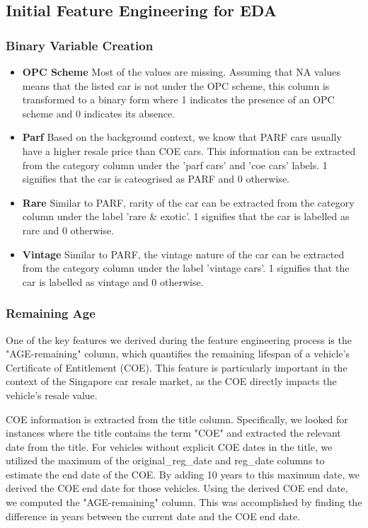 \documentclass[conference]{IEEEtran}
\begin{document}
\subsection{Initial Feature Engineering for EDA}
\label{subsec:feature_engineering}
\subsubsection{Binary Variable Creation}
\begin{itemize}
    \item \textbf{OPC Scheme} Most of the values are missing. Assuming that NA values means that the listed car is not under the OPC scheme, this column is transformed to a binary form where 1 indicates the presence of an OPC scheme and 0 indicates its absence.
    
    \item \textbf{Parf} Based on the background context, we know that PARF cars usually have a higher resale price than COE cars. This information can be extracted from the category column under the 'parf cars' and 'coe cars' labels. 1 signifies that the car is cateogrised as PARF and 0 otherwise.
    
    \item \textbf{Rare} Similar to PARF, rarity of the car can be extracted from the category column under the label 'rare \& exotic'. 1 signifies that the car is labelled as rare and 0 otherwise.
    
    \item \textbf{Vintage} Similar to PARF, the vintage nature of the car can be extracted from the category column under the label 'vintage cars'. 1 signifies that the car is labelled as vintage and 0 otherwise.
    
\end{itemize}

\subsubsection{Remaining Age}
One of the key features we derived during the feature engineering process is the "AGE-remaining" column, which quantifies the remaining lifespan of a vehicle's Certificate of Entitlement (COE). This feature is particularly important in the context of the Singapore car resale market, as the COE directly impacts the vehicle's resale value.

COE information is extracted from the title column. Specifically, we looked for instances where the title contains the term "COE" and extracted the relevant date from the title. 
For vehicles without explicit COE dates in the title, we utilized the maximum of the original\_reg\_date and reg\_date columns to estimate the end date of the COE. By adding 10 years to this maximum date, we derived the COE end date for those vehicles.
Using the derived COE end date, we computed the "AGE-remaining" column. This was accomplished by finding the difference in years between the current date and the COE end date. 
\end{document}
